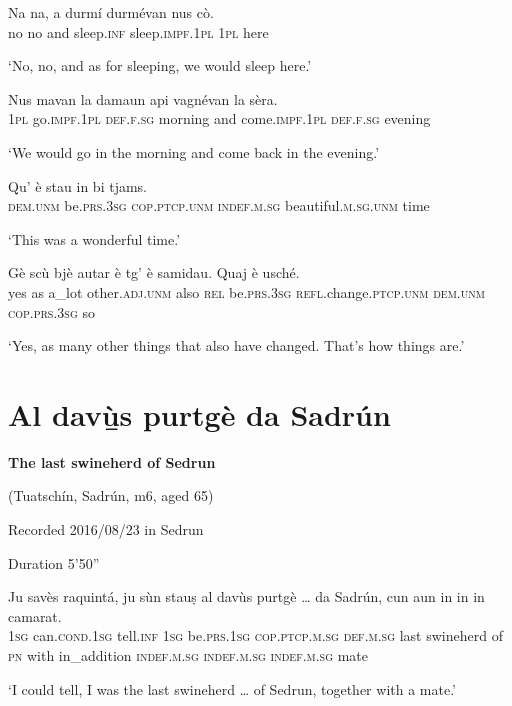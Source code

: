 \begin{linenumbers}
\gll    Na na, a durmí durmévan nus cò. \\
no no and sleep.\textsc{inf} sleep.\textsc{impf.1pl} \textsc{1pl} here \\
\end{linenumbers}
\medskip
\glt `No, no, and as for sleeping, we would sleep here.'
\medskip

\begin{linenumbers}
\gll    Nus mavan la damaun api vagnévan la sèra. \\
 \textsc{1pl} go.\textsc{impf.1pl}  \textsc{def.f.sg} morning and come.\textsc{impf.1pl} \textsc{def.f.sg} evening \\
\end{linenumbers}
\medskip
\glt `We would go in the morning and come back in the evening.'
\medskip

\begin{linenumbers}
\gll    Qu’ è stau in bi tjams. \\
 \textsc{dem.unm} be.\textsc{prs.3sg} \textsc{cop.ptcp.unm} \textsc{indef.m.sg} beautiful.\textsc{m.sg.unm} time\\
\end{linenumbers}
\medskip
\glt `This was a wonderful time.'
\medskip

\begin{linenumbers}
\gll    Gè scù bjè autar è tg’ è samidau. Quaj è usché.\\
yes as a\_lot other.\textsc{adj.unm} also \textsc{rel} be.\textsc{prs.3sg} \textsc{refl.}change.\textsc{ptcp.unm}  \textsc{dem.unm} \textsc{cop.prs.3sg} so\\
\end{linenumbers}
\medskip
\glt `Yes, as many other things that also have changed. That’s how things are.'
\medskip

\section{Al davù̱s purtgè da Sadrún}

\noindent
\textbf{The last swineherd of Sedrun}

\noindent
(Tuatschín, Sadrún, m6, aged 65)

\noindent
Recorded 2016/08/23 in Sedrun

\noindent
Duration 5'50''

\bigskip

\begin{linenumbers}
\gll    Ju savès raquintá, ju sùn stauṣ al davùs purtgè … da Sadrún, cun aun in in in camarat.\\
 \textsc{1sg} can.\textsc{cond.1sg} tell.\textsc{inf} \textsc{1sg} be.\textsc{prs.1sg} \textsc{cop.ptcp.m.sg} \textsc{def.m.sg} last swineherd {} of \textsc{pn} with in\_addition  \textsc{indef.m.sg}  \textsc{indef.m.sg}  \textsc{indef.m.sg} mate\\
\end{linenumbers}
\medskip
\glt `I could tell, I was the last swineherd … of Sedrun, together with a mate.'
\medskip

